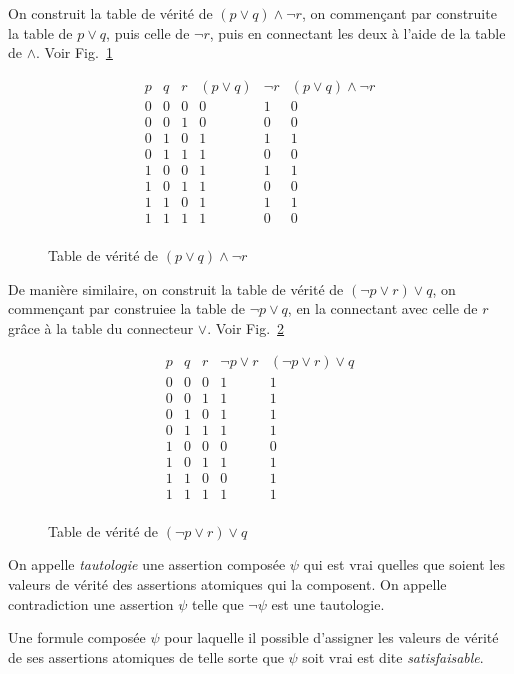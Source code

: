 \documentclass[french,course,oneside,theoremnosection]{lecture}
\begin{document}
\begin{example} On construit la table de vérité de $(p\vee q) \wedge \neg r$, on commençant par construite la table de $p \vee q$, puis celle de $\neg r$, puis en connectant les deux à l'aide de la table de $\wedge$. Voir Fig.~\ref{fig:vera01}
\begin{figure}
\[
\begin{array}{ccc|c|c||c}
  p & q & r & (p\vee q) & \neg r & (p\vee q) \wedge \neg r \\
  \hline
  0 & 0 & 0 & 0 & 1 & 0 \\
  0 & 0 & 1 & 0 & 0 & 0 \\
  0 & 1 & 0 & 1 & 1 & 1\\
  0 & 1 & 1 & 1 & 0 & 0 \\
  1 & 0 & 0 & 1 & 1 & 1 \\
  1 & 0 & 1 & 1 & 0 & 0 \\
  1 & 1 & 0 & 1 & 1 & 1 \\
  1 & 1 & 1 & 1 & 0 & 0 \\
\end{array}
\]\caption{Table de vérité de $(p\vee q) \wedge \neg r$ }\label{fig:vera01}
\end{figure}

De manière similaire, on construit la table de vérité de $(\neg p\vee r) \vee q$, on commençant par construiee la table de $\neg p \vee q$, en la connectant avec celle de $r$ grâce à la table du connecteur $\vee$. Voir Fig.~\ref{fig:vera02}
\begin{figure}
\[
\begin{array}{ccc|c||c}
  p & q & r & \neg p \vee r & (\neg p \vee r) \vee q \\
  \hline
  0 & 0 & 0 & 1 & 1  \\
  0 & 0 & 1 & 1 & 1  \\
  0 & 1 & 0 & 1 & 1  \\
  0 & 1 & 1 & 1 & 1  \\
  1 & 0 & 0 & 0 & 0  \\
  1 & 0 & 1 & 1 & 1  \\
  1 & 1 & 0 & 0 & 1  \\
  1 & 1 & 1 & 1 & 1  \\
\end{array}
\]\caption{Table de vérité de $(\neg p\vee r) \vee q$ }\label{fig:vera02}
\end{figure}
\end{example}

\begin{definition}
On appelle \emph{tautologie} une assertion composée $\psi$ qui est vrai quelles que soient les valeurs de vérité des assertions atomiques qui la composent. 
On appelle contradiction une assertion $\psi$ telle que $\neg \psi$ est une tautologie. 

Une formule composée $\psi$ pour laquelle il possible d'assigner les valeurs de vérité de ses assertions atomiques de telle sorte que $\psi$ soit vrai est dite \emph{satisfaisable}.
\end{definition}
\end{document}

